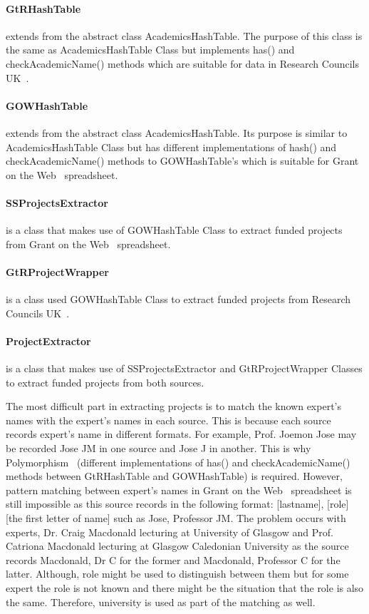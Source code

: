 \paragraph{GtRHashTable} extends from the abstract class AcademicsHashTable. The purpose of this class is the same as AcademicsHashTable Class but
implements has() and checkAcademicName() methods which are suitable for data in Research Councils UK~\cite{gtr}.
\paragraph{GOWHashTable} extends from the abstract class AcademicsHashTable. Its purpose is similar to AcademicsHashTable Class but
has different implementations of hash() and checkAcademicName() methods to GOWHashTable's which is suitable for Grant on the Web~\cite{gow} spreadsheet.
\paragraph{SSProjectsExtractor} is a class that makes use of GOWHashTable Class to extract funded projects from Grant on the Web~\cite{gow} spreadsheet.
\paragraph{GtRProjectWrapper} is a class used GOWHashTable Class to extract funded projects from Research Councils UK~\cite{gtr}.
\paragraph{ProjectExtractor} is a class that makes use of SSProjectsExtractor and GtRProjectWrapper Classes to extract funded projects from both sources.

The most difficult part in extracting projects is to match the known expert's names with the expert's names in each source. This is because each source
records expert's name in different formats. For example, Prof. Joemon Jose may be recorded Jose JM in one source and Jose J in another. This is why Polymorphism~\cite{polymorphism} 
(different implementations of has() and checkAcademicName() methods between GtRHashTable and GOWHashTable) is required. However, pattern matching between
expert's names in Grant on the Web~\cite{gow} spreadsheet is still impossible as this source records in the following format: 
[lastname], [role] [the first letter of name] such as Jose, Professor JM. The problem occurs with experts, Dr. Craig Macdonald lecturing at
University of Glasgow and Prof. Catriona Macdonald lecturing at Glasgow Caledonian University
as the source records Macdonald, Dr C for the former and Macdonald, Professor C for the latter. Although, role might be used to distinguish between them but
for some expert the role is not known and there might be the situation that the role is also the same. 
Therefore, university is used as part of the matching as well.

